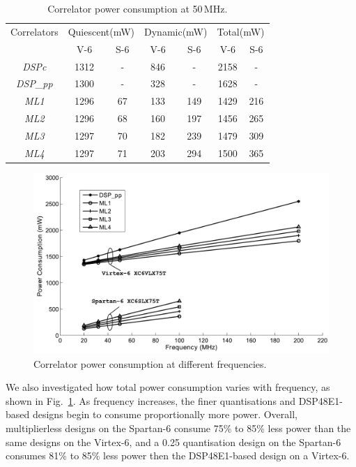 \begin{table}[h]
	\centering
	\caption{Correlator power consumption at 50\,MHz.}
	\label{tab:PWR}
	\begin{tabular}{c|c|c|c|c|c|c}
        \hline \hline
    			Correlators  & \multicolumn{2}{|c|}{Quiescent(mW)} &  \multicolumn{2}{|c|}{Dynamic(mW) }& \multicolumn{2}{|c}{Total(mW)} \\
	\cline{2-7}			& V-6 & S-6 & V-6 & S-6 & V-6 & S-6\\
	\hline
			\emph{DSPc}		&  1312 &  -  	 & 846 & -	& 2158 &-\\
			\emph{DSP\_pp} 	& 1300  &  -   & 328 & - 	& 1628 & -\\
 			\emph{ML1} 		& 1296  & 67 & 133 & 149	& 1429 & 216\\
			\emph{ML2} 		& 1296  & 68 & 160 & 197	& 1456 & 265\\
			\emph{ML3} 		& 1297  & 70 & 182 & 239	& 1479 & 309\\
			\emph{ML4} 		& 1297  & 71 & 203 & 294    & 1500 & 365\\

    	\hline \hline
    \end{tabular}
\end{table}


\begin{figure}
	\centerline{\includegraphics [width=0.9\columnwidth] {figures/Plot_PWR.pdf} }
	\caption{Correlator power consumption at different frequencies.}
	\label{fig:Plot_PWR}
\end{figure}

We also investigated how total power consumption varies with frequency, as shown in Fig.~\ref{fig:Plot_PWR}.
As frequency increases, the finer quantisations and DSP48E1-based designs begin to consume proportionally more power.
Overall, multiplierless designs on the Spartan-6 consume 75\% to 85\% less power than the same designs on the Virtex-6, and a 0.25 quantisation design on the Spartan-6 consumes 81\% to 85\% less power then the DSP48E1-based design on a Virtex-6.

